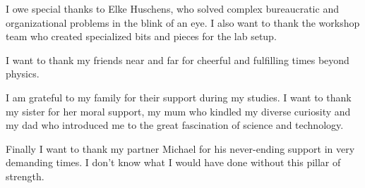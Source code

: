 	I owe special thanks to Elke Huschens, who solved complex bureaucratic and organizational problems in the blink of an eye.
	I also want to thank the workshop team who created specialized bits and pieces for the lab setup.

	I want to thank my friends near and far for cheerful and fulfilling times beyond physics. 

	I am grateful to my family for their support during my studies. I want to thank my sister for her moral support, my mum who kindled my diverse curiosity and my dad who introduced me to the great fascination of science and technology.
	
	Finally I want to thank my partner Michael for his never-ending support in very demanding times. I don't know what I would have done without this pillar of strength.

\vfill